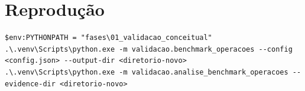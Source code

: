 \section{Reprodução}

\begin{Verbatim}[fontsize=\small]
$env:PYTHONPATH = "fases\01_validacao_conceitual"
.\.venv\Scripts\python.exe -m validacao.benchmark_operacoes --config <config.json> --output-dir <diretorio-novo>
.\.venv\Scripts\python.exe -m validacao.analise_benchmark_operacoes --evidence-dir <diretorio-novo>
\end{Verbatim}

